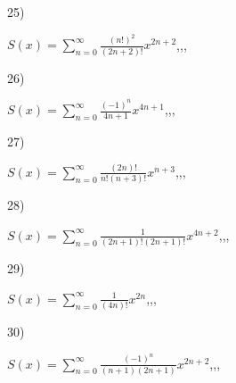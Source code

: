 \documentclass[11pt, ukrainian]{article}
\begin{document}
\par
\vspace{0.9cm}
25) \space 
{%
{$S(x)=\sum\limits_{n=0}^{\infty}{\frac{(n!)^2}{(2n+2)!}}{x^{{2n+2}}}$},,, \par \smallskip  
}
\par
\vspace{0.9cm}
26) \space 
{%
{$S(x)=\sum\limits_{n=0}^{\infty}{\frac{(-1)^n}{4n+1}}{x^{{4n+1}}}$},,, \par \smallskip  
}
\par
\vspace{0.9cm}
27) \space 
{%
{$S(x)=\sum\limits_{n=0}^{\infty}{\frac{(2n)!}{n!(n+3)!}}{x^{{n+3}}}$},,, \par \smallskip  
}
\par
\vspace{0.9cm}
28) \space 
{%
{$S(x)=\sum\limits_{n=0}^{\infty}{\frac{1}{(2n+1)!(2n+1)!}}{x^{{4n+2}}}$},,, \par \smallskip  
}
\par
\vspace{0.9cm}
29) \space 
{%
{$S(x)=\sum\limits_{n=0}^{\infty}{\frac{1}{(4n)!}}{x^{{2n}}}$},,, \par \smallskip  
}
\par
\vspace{0.9cm}
30) \space 
{%
{$S(x)=\sum\limits_{n=0}^{\infty}{\frac{(-1)^n}{(n+1)(2n+1)}}{x^{{2n+2}}}$},,, \par \smallskip  
}
\end{document}
